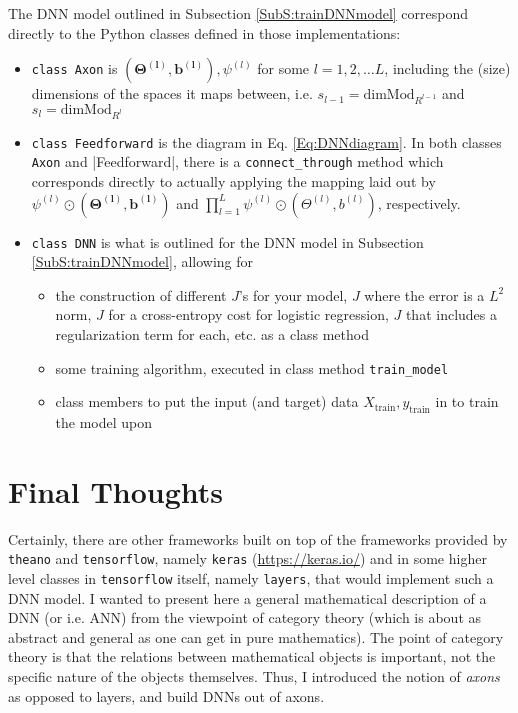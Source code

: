 \documentclass[10pt]{amsart}
\begin{document}
The DNN model outlined in Subsection \ref{SubS:trainDNNmodel} correspond directly to the Python classes defined in those implementations: 
\begin{itemize}
\item \verb|class Axon| is  $(\mathbf{\Theta^{(l)},b^{(l)}}), \psi^{(l)}$ for some $l=1,2,\dots L$, including the (size) dimensions of the spaces it maps between, i.e. $s_{l-1} = \text{dim}\text{Mod}_{R^{l-1}}$ and $s_{l} = \text{dim}\text{Mod}_{R^{l}}$
\item \verb|class Feedforward| is the diagram in Eq. \ref{Eq:DNNdiagram}.  In both classes \verb|Axon| and |Feedforward|, there is a \verb|connect_through| method which corresponds directly to actually applying the mapping laid out by $\psi^{(l)} \odot (\mathbf{\Theta^{(l)},b^{(l)}})$ and $\prod_{l=1}^{L} \psi^{(l)} \odot (\Theta^{(l)}, b^{(l)})$, respectively.  
\item \verb|class DNN| is what is outlined for the DNN model in Subsection \ref{SubS:trainDNNmodel}, allowing for 
\begin{itemize}
\item the construction of different $J$'s for your model, $J$ where the error is a $L^2$ norm, $J$ for a cross-entropy cost for logistic regression, $J$ that includes a regularization term for each, etc. as a class method
\item some training algorithm, executed in class method \verb|train_model|
\item class members to put the input (and target) data $X_{\text{train}}, y_{\text{train}}$ in to train the model upon 
\end{itemize}
\end{itemize}

\section{Final Thoughts}

Certainly, there are other frameworks built on top of the frameworks provided by \verb|theano| and \verb|tensorflow|, namely \verb|keras| (\url{https://keras.io/}) and in some higher level classes in \verb|tensorflow| itself, namely \verb|layers|, that would implement such a DNN model.  I wanted to present here a general mathematical description of a DNN (or i.e. ANN) from the viewpoint of category theory (which is about as abstract and general as one can get in pure mathematics).  The point of category theory is that the relations between mathematical objects is important, not the specific nature of the objects themselves.  Thus, I introduced the notion of \emph{axons} as opposed to layers, and build DNNs out of axons.  
\end{document}
